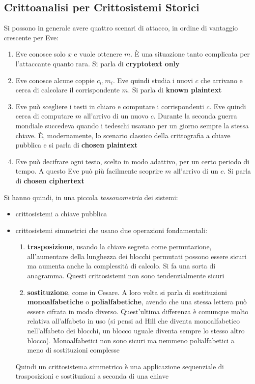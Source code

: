 \documentclass[a4paper,12pt, oneside]{book}
\begin{document}
\subsection{Crittoanalisi per Crittosistemi Storici}
Si possono in generale avere quattro scenari di attacco, in ordine di vantaggio
crescente per Eve:
\begin{enumerate}
  \item Eve conosce solo $x$ e vuole ottenere $m$. È una situazione tanto
  complicata per l'attaccante quanto rara. Si parla di \textbf{cryptotext only}
  \item Eve conosce alcune coppie $c_i,m_i$. Eve quindi studia i nuovi $c$ che
  arrivano e cerca di calcolare il corrispondente $m$. Si parla di \textbf{known
  plaintext}
  \item Eve può scegliere i testi in chiaro e computare i corrispondenti
  $c$. Eve quindi cerca di computare $m$ all'arrivo di un nuovo $c$. Durante la
  seconda guerra mondiale succedeva quando i tedeschi usavano per un giorno
  sempre la stessa chiave. È, modernamente, lo
  scenario classico della crittografia a chiave pubblica e si parla di
  \textbf{chosen plaintext} 
  \item Eve può decifrare ogni testo, scelto in modo adattivo, per un certo
  periodo di tempo. A questo Eve può più facilmente scoprire $m$ all'arrivo di
  un $c$. Si parla di \textbf{chosen ciphertext} 
\end{enumerate}
Si hanno quindi, in una piccola \textit{tassonometria} dei sistemi:
\begin{itemize}
  \item crittosistemi a chiave pubblica
  \item crittosistemi simmetrici che usano due operazioni fondamentali:
  \begin{enumerate}
    \item \textbf{trasposizione}, usando la chiave segreta come permutazione,
    all'aumentare della lunghezza dei blocchi permutati possono essere sicuri ma
    aumenta anche la complessità di calcolo. Si fa una sorta di
    anagramma. Questi crittosistemi non sono tendenzialmente sicuri
    \item \textbf{sostituzione}, come in Cesare. A loro volta si parla di
    sostituzioni \textbf{monoalfabetiche} o \textbf{polialfabetiche}, avendo che
    una stessa lettera può essere cifrata in modo diverso. Quest'ultima
    differenza è comunque molto relativa all'alfabeto in uso (si pensi ad Hill
    che diventa monoalfabetico nell'alfabeto dei blocchi, un blocco uguale
    diventa sempre lo stesso altro blocco). Monoalfabetici non sono sicuri ma
    nemmeno polialfabetici a meno di sostituzioni complesse
  \end{enumerate}
  Quindi un crittosistema simmetrico è una applicazione sequenziale di
  trasposizioni e sostituzioni a seconda di una chiave
\end{itemize}
\end{document}
